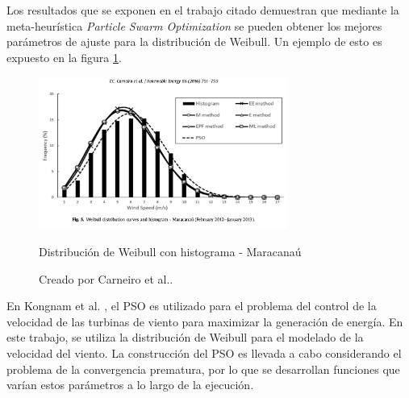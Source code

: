Los resultados que se exponen en el trabajo citado demuestran que mediante la meta-heurística \emph{Particle Swarm Optimization} se pueden obtener los mejores parámetros de ajuste para la distribución de Weibull. Un ejemplo de esto es expuesto en la figura \ref{fig:pso_fit}.
\begin{figure}[h!]
    \centering    
    \includegraphics[height=50mm]{figures/pso_fit.png} 
    \caption{Distribución de Weibull con histograma - Maracanaú}
    \vspace{-.25cm} 
    \caption*{Creado por Carneiro et al.\cite{Carneiro15}.}
    \label{fig:pso_fit}
\end{figure}
En Kongnam et al. \cite{Kongnam15}, el PSO es utilizado para el problema del control de la velocidad de las turbinas de viento para maximizar la generación de energía. En este trabajo, se utiliza la distribución de Weibull para el modelado de la velocidad del viento. La construcción del PSO es llevada a cabo considerando el problema de la convergencia prematura, por lo que se desarrollan funciones que varían estos parámetros a lo largo de la ejecución.\\

